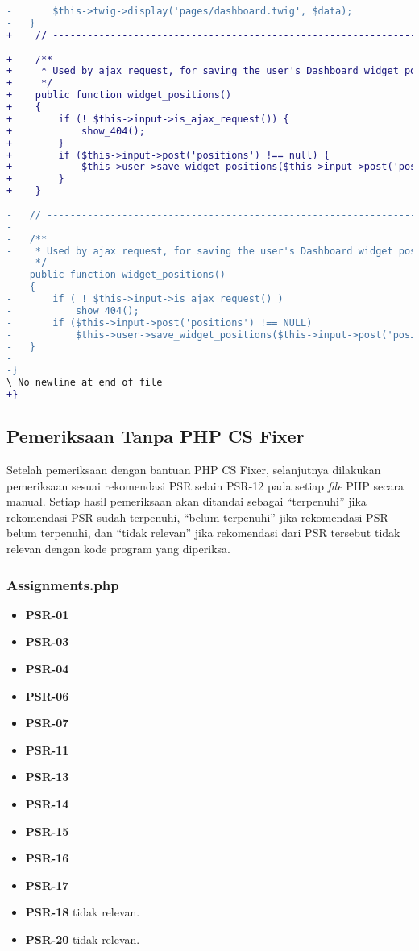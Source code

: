\begin{lstlisting}[language=diff, basicstyle=\ttfamily, frame=single,
	columns=fullflexible, keepspaces=true, breaklines=true, label=ck:31, caption=Contoh penggunaan PHP CS Fixer pada \textit{Dashboard.php}]
-		$this->twig->display('pages/dashboard.twig', $data);
-	}
+    // ------------------------------------------------------------------------
	
+    /**
+     * Used by ajax request, for saving the user's Dashboard widget positions
+     */
+    public function widget_positions()
+    {
+        if (! $this->input->is_ajax_request()) {
+            show_404();
+        }
+        if ($this->input->post('positions') !== null) {
+            $this->user->save_widget_positions($this->input->post('positions'));
+        }
+    }
	
-	// ------------------------------------------------------------------------
-
-	/**
-	 * Used by ajax request, for saving the user's Dashboard widget positions
-	 */
-	public function widget_positions()
-	{
-		if ( ! $this->input->is_ajax_request() )
-			show_404();
-		if ($this->input->post('positions') !== NULL)
-			$this->user->save_widget_positions($this->input->post('positions'));
-	}
-
-}
\ No newline at end of file
+}

\end{lstlisting}

\subsection{Pemeriksaan Tanpa PHP CS Fixer}
\label{periksa_manual}
Setelah pemeriksaan dengan bantuan PHP CS Fixer, selanjutnya dilakukan pemeriksaan sesuai rekomendasi PSR selain PSR-12 pada setiap \textit{file} PHP secara manual. Setiap hasil pemeriksaan akan ditandai sebagai ``terpenuhi'' jika rekomendasi PSR sudah terpenuhi, ``belum terpenuhi'' jika rekomendasi PSR belum terpenuhi, dan ``tidak relevan'' jika rekomendasi dari PSR tersebut tidak relevan dengan kode program yang diperiksa.

\subsubsection{Assignments.php} 
\begin{itemize}
	\item \textbf{PSR-01} 
	\item \textbf{PSR-03}
	\item \textbf{PSR-04}
	\item \textbf{PSR-06}
	\item \textbf{PSR-07}
	\item \textbf{PSR-11}
	\item \textbf{PSR-13}
	\item \textbf{PSR-14}
	\item \textbf{PSR-15}
	\item \textbf{PSR-16}
	\item \textbf{PSR-17} 
	\item \textbf{PSR-18} tidak relevan.
	\item \textbf{PSR-20} tidak relevan.
\end{itemize}

